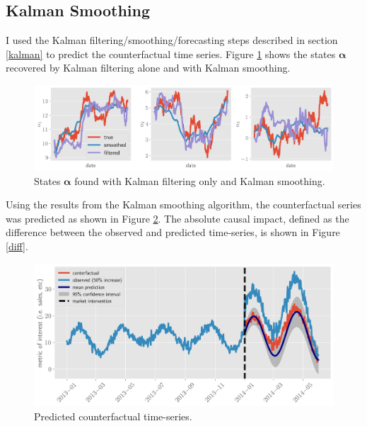 \documentclass[12pt]{article}
\begin{document}
\newpage

\subsection{Kalman Smoothing}
I used the Kalman filtering/smoothing/forecasting steps described in section \ref{kalman} to predict the counterfactual time series. Figure \ref{states} shows the states $\boldsymbol{\alpha}$ recovered by Kalman filtering alone and with Kalman smoothing.


\begin{figure}[!h]
    \centering
    \includegraphics[scale=.5
    ]{../figures/states.png}
    \caption{States $\boldsymbol{\alpha}$ found with Kalman filtering only and Kalman smoothing. }
    \label{states}
\end{figure}

Using the results from the Kalman smoothing algorithm, the  counterfactual series was predicted as shown in Figure \ref{pred}. The absolute causal impact, defined as the difference between the observed and predicted time-series, is shown in Figure \ref{diff}.
\begin{figure}[!h]
    \centering
    \includegraphics[scale=.5
    ]{../figures/pred.png}
    \caption{Predicted counterfactual time-series.}
    \label{pred}
\end{figure}
\end{document}
